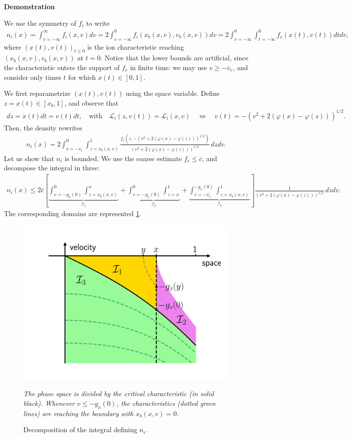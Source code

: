 \documentclass{article}
\numberwithin{equation}{section}
\newcommand{\mysubcaption}[1]{
	\vspace*{5pt}
	\begin{minipage}{0.8\linewidth}
		\begin{center}
			\footnotesize\emph{#1}
		\end{center}
	\end{minipage}
}
\newcommand{\myproof}[1]{
	\noindent \textbf{Demonstration}
	{\small	#1 \hfill \qedsymbol}
}
\newcommand{\ve}{{\overline{v}_e}} %
\newcommand{\DomUpL}{{\mathcal{D}_1}} %
\newcommand{\DomUpR}{{\mathcal{D}_2}} %
\newcommand{\DomLow}{{\mathcal{D}_3}} %
\newcommand{\IntUpL}{{\mathcal{I}_1}} %
\newcommand{\IntUpR}{{\mathcal{I}_2}} %
\newcommand{\IntLow}{{\mathcal{I}_3}} %
\newcommand{\maxfe}{{\overline{c}}} %
\begin{document}
\myproof{
	We use the symmetry of $f_i$ to write
	\begin{align*}
		n_i(x) = \int_{v=-\infty}^{\infty} f_i(x,v) dv = 2 \int_{v=-\infty}^{0} f_i(x_b(x,v), v_b(x,v)) dv = 2 \int_{v=-\infty}^{0} \int_{t=-\infty}^{0} f_e(x(t),v(t)) dt dv,
	\end{align*}
	where $(x(t),v(t))_{t\leqslant0}$ is the ion characteristic reaching $(x_b(x,v),v_b(x,v))$ at $t=0$. Notice that the lower bounds are artificial, since the characteristic enters the support of $f_e$ in finite time: we may use $v \geqslant -\ve$, and consider only times $t$ for which $x(t) \in [0,1]$. 
	
	We first reparametrize $(x(t),v(t))$ using the space variable. Define $z = x(t) \in[x_b,1]$, and observe that
	\begin{align*}
		dz = \dot{x}(t) dt = v(t) dt, \quad \text{with}\quad \mathcal{L}_i(z,v(t)) = \mathcal{L}_i(x,v) \quad\iff\quad v(t) = -\left(v^2 + 2\left(\varphi(x) - \varphi(z)\right)\right)^{1/2}.
	\end{align*}
	Then, the density rewrites
	\begin{align*}
		n_i(x) = 2 \int_{v=-\ve}^{0} \int_{z=x_b(x,v)}^{1} \frac{f_e\left(z, -\left(v^2 + 2\left(\varphi(x) - \varphi(z)\right)\right)^{1/2}\right)}{\left(v^2 + 2\left(\varphi(x) - \varphi(z)\right)\right)^{1/2}} \, dz dv.
	\end{align*}
	Let us show that $n_i$ is bounded. We use the coarse estimate $f_e \leqslant \maxfe$, and decompose the integral in three:
	\begin{align*}
		n_i(x) \leqslant 2 \maxfe \left[
		\underbrace{\int_{v=-g_x(0)}^{0} \int_{z=x_b(x,v)}^{x}}_{\IntUpL} + 
		\underbrace{\int_{v=-g_x(0)}^{0} \int_{z=x}^{1}}_{\IntUpR} + 
		\underbrace{\int_{v=-\ve}^{-g_x(0)} \int_{z=x_b(x,v)}^{1}}_{\IntLow} \right] 
		\frac{1}{\left(v^2 + 2\left(\varphi(x) - \varphi(z)\right)\right)^{1/2}} \, dz dv.
	\end{align*}
	The corresponding domains are represented \cref{fig:charmaps_domainmap}. 
	\begin{figure}
		\centering
		\includegraphics[width=0.5\linewidth]{images/fpcharmaps_domainmap}
		\caption{Decomposition of the integral defining $n_i$.}
		\mysubcaption{The phase space is divided by the critical characteristic (in solid black). Whenever $v\leqslant -g_x(0)$, the characteristics (dotted green lines) are reaching the boundary with $x_b(x,v)=0$. }
		\label{fig:charmaps_domainmap}
	\end{figure}
	
}
\end{document}
